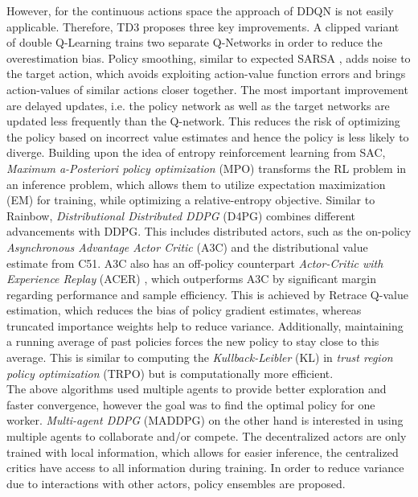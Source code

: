 	However, for the continuous actions space the approach of DDQN \cite{VanHasselt2016} is not easily applicable.
	Therefore, TD3 proposes three key improvements.
	A clipped variant of double Q-Learning trains two separate Q-Networks in order to reduce the overestimation bias.
	Policy smoothing, similar to expected SARSA \cite{VanSeijen2009}, adds noise to the target action, which avoids exploiting action-value function errors and brings action-values of similar actions closer together.
	The most important improvement are delayed updates, i.e. the policy network as well as the target networks are updated less frequently than the Q-network.
	This reduces the risk of optimizing the policy based on incorrect value estimates and hence the policy is less likely to diverge.	
	Building upon the idea of entropy reinforcement learning from SAC, \textit{Maximum a-Posteriori policy optimization} (MPO) \cite{Abdolmaleki2018} transforms the RL problem in an inference problem, which allows them to utilize expectation maximization (EM) for training, while optimizing a relative-entropy objective.
	Similar to Rainbow, \textit{Distributional Distributed DDPG} (D4PG) \cite{Barth-Maron2018} combines different advancements with DDPG.
	This includes distributed actors, such as the on-policy \textit{Asynchronous Advantage Actor Critic} (A3C) \cite{Mnih2016} and the distributional value estimate from C51.
	A3C also has an off-policy counterpart \textit{Actor-Critic with Experience Replay} (ACER) \cite{Wang2017}, which outperforms A3C by significant margin regarding performance and sample efficiency. 
	This is achieved by Retrace \cite{Munos2016} Q-value estimation, which reduces the bias of policy gradient estimates, whereas truncated importance weights help to reduce variance.
	Additionally, maintaining a running average of past policies forces the new policy to stay close to this average.
	This is similar to computing the \textit{Kullback-Leibler} (KL) in \textit{trust region policy optimization} (TRPO) but is computationally more efficient.\\
	The above algorithms used multiple agents to provide better exploration and faster convergence, however the goal was to find the optimal policy for one worker. 
	\textit{Multi-agent DDPG} (MADDPG) \cite{Lowe2017} on the other hand is interested in using multiple agents to collaborate and/or compete. 
	The decentralized actors are only trained with local information, which allows for easier inference, the centralized critics have access to all information during training. 
	In order to reduce variance due to interactions with other actors, policy ensembles are proposed.
		
